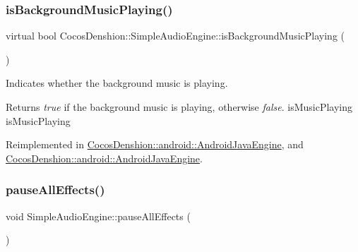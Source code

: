\mbox{\label{classCocosDenshion_1_1SimpleAudioEngine_a0fd9c2b74e6b71df1c2ec64b95ba6549}} 
\subsubsection{\texorpdfstring{is\+Background\+Music\+Playing()}{isBackgroundMusicPlaying()}\hspace{0.1cm}{\footnotesize\ttfamily [2/2]}}
{\footnotesize\ttfamily virtual bool Cocos\+Denshion\+::\+Simple\+Audio\+Engine\+::is\+Background\+Music\+Playing (\begin{DoxyParamCaption}{ }\end{DoxyParamCaption})\hspace{0.3cm}{\ttfamily [virtual]}}

Indicates whether the background music is playing.

\begin{DoxyReturn}{Returns}
{\itshape true} if the background music is playing, otherwise {\itshape false}.  is\+Music\+Playing  is\+Music\+Playing 
\end{DoxyReturn}


Reimplemented in \hyperlink{classCocosDenshion_1_1android_1_1AndroidJavaEngine_ac709dfafca7cee544b93cf91c0cf3d2d}{Cocos\+Denshion\+::android\+::\+Android\+Java\+Engine}, and \hyperlink{classCocosDenshion_1_1android_1_1AndroidJavaEngine_a2bfbe26dae6b6a8a18fcd3e6e97f0c7e}{Cocos\+Denshion\+::android\+::\+Android\+Java\+Engine}.

\mbox{\label{classCocosDenshion_1_1SimpleAudioEngine_a50ce3f003c8028e4e2c23e36db89d362}} 
\subsubsection{\texorpdfstring{pause\+All\+Effects()}{pauseAllEffects()}\hspace{0.1cm}{\footnotesize\ttfamily [1/2]}}
{\footnotesize\ttfamily void Simple\+Audio\+Engine\+::pause\+All\+Effects (\begin{DoxyParamCaption}{ }\end{DoxyParamCaption})\hspace{0.3cm}{\ttfamily [virtual]}}

